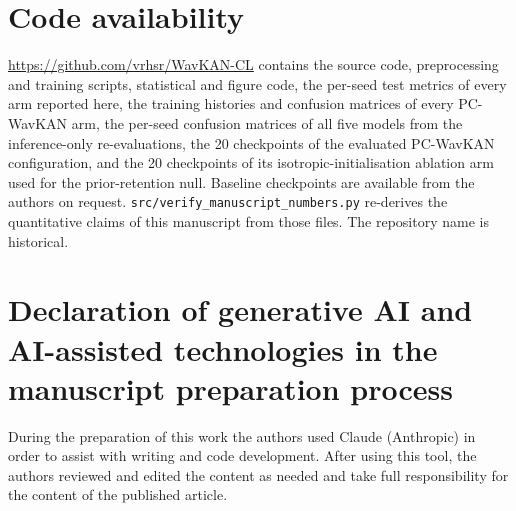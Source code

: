 \documentclass[preprint,12pt]{elsarticle}
\begin{document}
\section*{Code availability}
\url{https://github.com/vrhsr/WavKAN-CL} contains the source code, preprocessing and training scripts, statistical and figure code, the per-seed test metrics of every arm reported here, the training histories and confusion matrices of every PC-WavKAN arm, the per-seed confusion matrices of all five models from the inference-only re-evaluations, the 20 checkpoints of the evaluated PC-WavKAN configuration, and the 20 checkpoints of its isotropic-initialisation ablation arm used for the prior-retention null. Baseline checkpoints are available from the authors on request. \texttt{src/verify\_manuscript\_numbers.py} re-derives the quantitative claims of this manuscript from those files. The repository name is historical.

\section*{Declaration of generative AI and AI-assisted technologies in the manuscript preparation process}
During the preparation of this work the authors used Claude (Anthropic) in order to assist with writing and code development. After using this tool, the authors reviewed and edited the content as needed and take full responsibility for the content of the published article.



\end{document}
